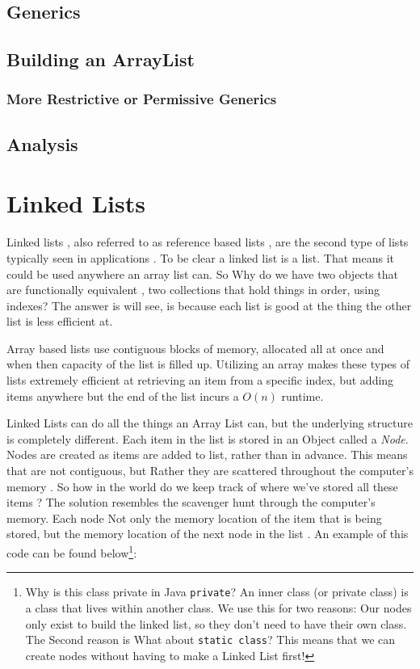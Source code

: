 \documentclass[10pt,a4paper]{book}
\begin{document}
\section{Generics}
\section{Building an ArrayList}
\label{buildingArraylist}

\subsection{More Restrictive or Permissive Generics}

\section{Analysis}
\chapter{Linked Lists}
Linked lists , also referred to as reference based lists , are the second type of lists typically seen in applications . To be clear a linked list is a list. That means it could be used anywhere an array list can.   So Why do we have two objects that are functionally equivalent , two collections that hold things in order, using indexes?  The answer is will see, is because each list is good at the thing the other list is less efficient at.


Array based lists use contiguous blocks of memory, allocated all at once and when then capacity of the list is filled up.  Utilizing an array makes these types of lists extremely efficient at retrieving an item from a specific index, but adding items anywhere but the end of the list incurs a $O(n)$ runtime.



Linked Lists can do all the things an Array List can, but the underlying structure is completely different.  
Each item in the list is stored in an Object called a \textit{Node}.  Nodes are created as items are added to list, rather than in advance.  This means that are not contiguous, but Rather they are scattered throughout the computer's memory . So how in the world do we keep track of where we've stored all these items ? The solution resembles the scavenger hunt through the computer's memory.  Each node Not only the memory location of the item that is being stored, but the memory location of the next node in the list . An example of this code can be found below\footnote{Why is this class private in Java \texttt{private}? An inner class  (or private class) is a class that lives within another class.  We use this for two reasons:  Our nodes only exist to build the linked list, so they don't need to have their own class.  The Second reason is   What about \texttt{static class}? This means that we can create nodes without having to make a Linked List first! }: %
\end{document}
